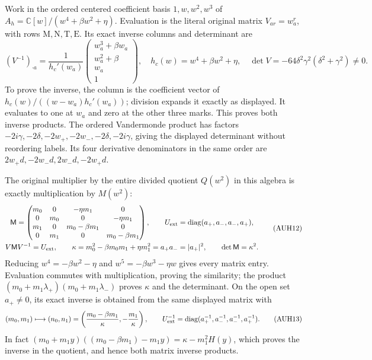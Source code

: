 \documentclass[11pt]{article}
\begin{document}
Work in the ordered centered coefficient basis $1,w,w^2,w^3$ of
$A_h=\mathbb C[w]/(w^4+\beta w^2+\eta)$.
Evaluation is the literal original matrix $V_{ar}=w_a^r$, with
rows $\mathrm M,\mathrm N,\mathrm T,\mathrm E$.
Its exact inverse columns and determinant are
\[
 (V^{-1})_{\cdot a}
 =\frac1{h_c'(w_a)}
 \begin{pmatrix}w_a^3+\beta w_a\\w_a^2+\beta\\w_a\\1\end{pmatrix},
 \quad h_c(w)=w^4+\beta w^2+\eta,\quad
 \det V=-64\delta^2\gamma^2(\delta^2+\gamma^2)\ne0.
 \tag{AUH11}
\]
To prove the inverse, the column is the coefficient vector of
$h_c(w)/((w-w_a)h_c'(w_a))$; division expands it exactly as
displayed.  It evaluates to one at $w_a$ and zero at the other
three marks.  This proves both inverse products.
The ordered Vandermonde product has factors
$-2i\gamma,-2\delta,-2w_+,-2w_-,-2\delta,-2i\gamma$,
giving the displayed determinant without reordering labels.
Its four derivative denominators in the same order are
$2w_+d,-2w_-d,2w_-d,-2w_+d$.

The original multiplier by the entire divided quotient $Q(w^2)$
in this algebra is exactly multiplication by $M(w^2)$:
\[
\begin{gathered}
 \mathsf M=
 \begin{pmatrix}
 m_0&0&-\eta m_1&0\\
 0&m_0&0&-\eta m_1\\
 m_1&0&m_0-\beta m_1&0\\
 0&m_1&0&m_0-\beta m_1
 \end{pmatrix},\qquad
 U_{\rm ext}=\operatorname{diag}(a_+,a_-,a_-,a_+),\\
 V\mathsf M V^{-1}=U_{\rm ext},\qquad
 \kappa=m_0^2-\beta m_0m_1+\eta m_1^2=a_+a_-=|a_+|^2,
 \qquad\det\mathsf M=\kappa^2.
\end{gathered}\tag{AUH12}
\]
Reducing $w^4=-\beta w^2-\eta$ and
$w^5=-\beta w^3-\eta w$ gives every matrix entry.
Evaluation commutes with multiplication, proving the similarity;
the product $(m_0+m_1\lambda_+)(m_0+m_1\lambda_-)$ proves
$\kappa$ and the determinant.
On the open set $a_+\ne0$, its exact inverse is obtained from
the same displayed matrix with
\[
 (m_0,m_1)\longmapsto
 (n_0,n_1)=\left(\frac{m_0-\beta m_1}{\kappa},
                         -\frac{m_1}{\kappa}\right),\qquad
 U_{\rm ext}^{-1}=\operatorname{diag}(a_+^{-1},a_-^{-1},a_-^{-1},a_+^{-1}).
 \tag{AUH13}
\]
In fact
$(m_0+m_1y)((m_0-\beta m_1)-m_1y)=\kappa-m_1^2H(y)$,
which proves the inverse in the quotient, and hence both matrix
inverse products.
\end{document}
